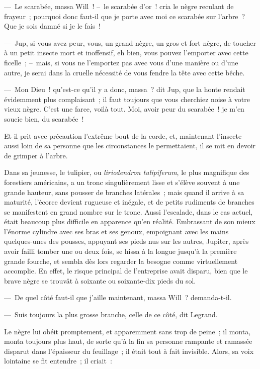 \documentclass[french,twoside]{book} %
\begin{document}
— Le scarabée, massa Will ! – le scarabée d’or ! cria le nègre reculant de frayeur ; pourquoi donc faut-il que je porte avec moi ce scarabée sur l’arbre ? Que je sois damné si je le fais !\par
— Jup, si vous avez peur, vous, un grand nègre, un gros et fort nègre, de toucher à un petit insecte mort et inoffensif, eh bien, vous pouvez l’emporter avec cette ficelle ; – mais, si vous ne l’emportez pas avec vous d’une manière ou d’une autre, je serai dans la cruelle nécessité de vous fendre la tête avec cette bêche.\par
— Mon Dieu ! qu’est-ce qu’il y a donc, massa ? dit Jup, que la honte rendait évidemment plus complaisant ; il faut toujours que vous cherchiez noise à votre vieux nègre. C’est une farce, voilà tout. Moi, avoir peur du scarabée ! je m’en soucie bien, du scarabée !\par
Et il prit avec précaution l’extrême bout de la corde, et, maintenant l’insecte aussi loin de sa personne que les circonstances le permettaient, il se mit en devoir de grimper à l’arbre.\par
Dans sa jeunesse, le tulipier, ou \emph{liriodendron tulipiferum}, le plus magnifique des forestiers américains, a un tronc singulièrement lisse et s’élève souvent à une grande hauteur, sans pousser de branches latérales ; mais quand il arrive à sa maturité, l’écorce devient rugueuse et inégale, et de petits rudiments de branches se manifestent en grand nombre sur le tronc. Aussi l’escalade, dans le cas actuel, était beaucoup plus difficile en apparence qu’en réalité. Embrassant de son mieux l’énorme cylindre avec ses bras et ses genoux, empoignant avec les mains quelques-unes des pousses, appuyant ses pieds nus sur les autres, Jupiter, après avoir failli tomber une ou deux fois, se hissa à la longue jusqu’à la première grande fourche, et sembla dès lors regarder la besogne comme virtuellement accomplie. En effet, le risque principal de l’entreprise avait disparu, bien que le brave nègre se trouvât à soixante ou soixante-dix pieds du sol.\par
— De quel côté faut-il que j’aille maintenant, massa Will ? demanda-t-il.\par
— Suis toujours la plus grosse branche, celle de ce côté, dit Legrand.\par
Le nègre lui obéit promptement, et apparemment sans trop de peine ; il monta, monta toujours plus haut, de sorte qu’à la fin sa personne rampante et ramassée disparut dans l’épaisseur du feuillage ; il était tout à fait invisible. Alors, sa voix lointaine se fit entendre ; il criait :\par
\end{document}
